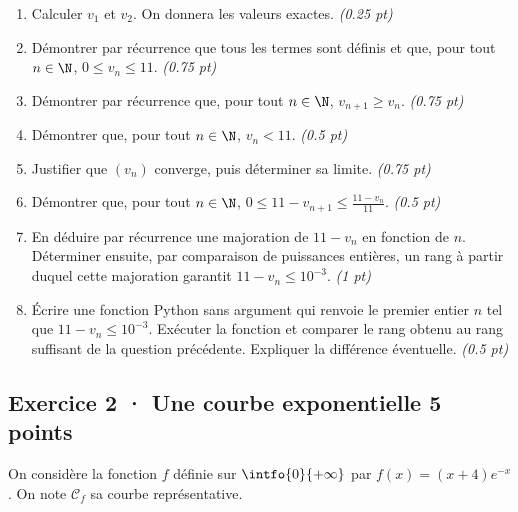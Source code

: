 \begin{enumerate}

\item Calculer $v_1$ et $v_2$. On donnera les valeurs exactes. \hfill\textit{(\num{0,25} pt)}

\item Démontrer par récurrence que tous les termes sont définis et que, pour tout $n\in\N$, $0\le v_n\le11$. \hfill\textit{(\num{0,75} pt)}

\item Démontrer par récurrence que, pour tout $n\in\N$, $v_{n+1}\ge v_n$. \hfill\textit{(\num{0,75} pt)}

\item Démontrer que, pour tout $n\in\N$, $v_n<11$. \hfill\textit{(\num{0,5} pt)}

\item Justifier que $(v_n)$ converge, puis déterminer sa limite. \hfill\textit{(\num{0,75} pt)}

\item Démontrer que, pour tout $n\in\N$, $0\le 11-v_{n+1}\le\frac{11-v_n}{11}$. \hfill\textit{(\num{0,5} pt)}

\item En déduire par récurrence une majoration de $11-v_n$ en fonction de $n$. Déterminer ensuite, par comparaison de puissances entières, un rang à partir duquel cette majoration garantit $11-v_n\le10^{-3}$. \hfill\textit{(1 pt)}

\item Écrire une fonction Python sans argument qui renvoie le premier entier $n$ tel que $11-v_n\le10^{-3}$. Exécuter la fonction et comparer le rang obtenu au rang suffisant de la question précédente. Expliquer la différence éventuelle. \hfill\textit{(\num{0,5} pt)}

\end{enumerate}

\subsection*{Exercice 2 · Une courbe exponentielle \hfill 5 points}On considère la fonction $f$ définie sur $\intfo{0}{+\infty}$ par $f(x)=(x+4)e^{-x}$. On note $\mathcal C_f$ sa courbe représentative.

